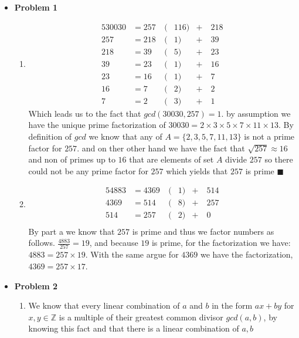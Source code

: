 \documentclass{article}
\begin{document}
\begin{itemize}
	\item{\textcolor{for}{\textbf{Problem 1}}}
		\begin{enumerate}[label=(\alph*)]
		\item 
			\begin{alignat*}{5}
				30030 &= 257\ & ( & 116 ) &+&\ 218 \\
				257   &= 218\ & ( & 1 )   &+&\ 39  \\
				218   &= 39\  & ( & 5 )   &+&\ 23  \\
				39    &= 23\  & ( & 1 )   &+&\ 16  \\
				23    &= 16\  & ( & 1 )   &+&\ 7   \\
				16    &= 7\   & ( & 2 )   &+&\ 2   \\
				7     &= 2\   & ( & 3 )   &+&\ 1
			\end{alignat*}
			Which leads us to the fact that $gcd(30030, 257)=1$. by assumption we have the
			unique prime factorization of $30030=2 \times 3 \times 5 \times 7 \times 11 \times 13$.
			By definition of $gcd$ we know that any of $A=\{2, 3, 5, 7, 11, 13\}$ is not a prime factor for $257$.
			and on ther other hand we have the fact that $\sqrt{257}\approx 16$ and non of primes up to $16$ 
			that are elements of set $A$ divide
			$257$ so there could not be any prime factor for $257$ which yields that $257$ is prime $\blacksquare$
		\item 
		\begin{alignat*}{5}
				4883 &= 4369\ & ( & 1 )  &+&\ 514 \\
				4369 &= 514\  & ( & 8 )  &+&\ 257  \\
				514  &= 257\  & ( & 2 )  &+&\ 0  \\
		\end{alignat*}
		By part a we know that $257$ is prime and thus we factor numbers as follows.
		$\tfrac{4883}{257}=19$, and because $19$ is prime, for the factorization we have: $4883 = 257 \times 19$.
		With the same argue for $4369$ we have the factorization, $4369 = 257 \times 17$.
		\end{enumerate}
	\item{\textcolor{for}{\textbf{Problem 2}}}
	\begin{enumerate}[label=(\alph*)]
		\item
			We know that every linear combination of $a$ and $b$ in the form $ax+by$ for $x,y\in \mathbb{Z}$ is a multiple of
			their greatest common divisor $gcd(a,b)$, by knowing this fact and that there is a linear combination of $a,b$ 

\end{enumerate}
\end{itemize}
\end{document}
